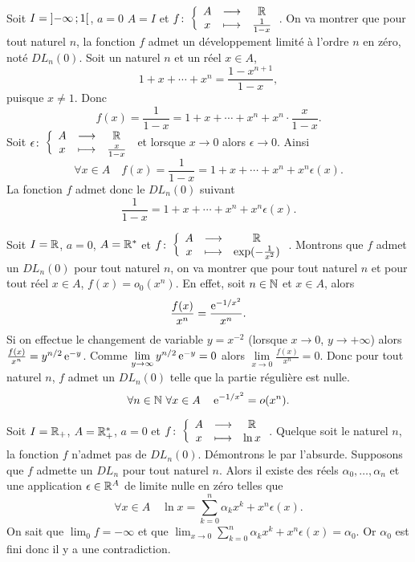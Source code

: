 Soit \(I=\left] -\infty \, ; {} 1 \right[\), \(a=0\) \(A=I\) et
\(f\colon\left\{\begin{array}{ccc}A & \longrightarrow &\mathbb{R}\\x & \longmapsto & \frac{1}{1-x}\end{array}\right.\). On va montrer que pour tout naturel
\(n\), la fonction \(f\) admet un développement limité à l'ordre \(n\) en zéro,
noté \(DL_n(0)\). Soit un naturel \(n\) et un réel \(x \in A\),
\begin{equation}
  1+x+ \dotsb + x^n = \frac{1-x^{n+1}}{1-x},
\end{equation}
puisque \(x \neq 1\). Donc
\begin{equation}
  f(x) = \frac{1}{1-x}=1+x+ \dotsb + x^n + x^n \cdot \frac{x}{1-x}.
\end{equation}
Soit \(\epsilon\colon\left\{\begin{array}{ccc}A & \longrightarrow &\mathbb{R}\\x & \longmapsto & \frac{x}{1-x}\end{array}\right.\) et lorsque \(x \to 0\)
alors \(\epsilon \to 0\). Ainsi
\begin{equation}
  \forall x \in A \quad f(x) = \frac{1}{1-x}=1+x+ \dotsb + x^n + x^n
  \epsilon(x).
\end{equation}
La fonction \(f\) admet donc le \(DL_n(0)\) suivant
\begin{equation}
  \frac{1}{1-x} = 1+x+ \dotsb + x^n + x^n \epsilon(x).
\end{equation}

Soit \(I=\mathbb{R}\), \(a=0\), \(A=\mathbb{R}^*\) et
\(f\colon\left\{\begin{array}{ccc}A & \longrightarrow &\mathbb{R}\\x & \longmapsto & \exp(-\frac{1}{x^2})\end{array}\right.\). Montrons que \(f\) admet un
\(DL_n(0)\) pour tout naturel \(n\), on va montrer que pour tout naturel \(n\)
et pour tout réel \(x \in A\), \(f(x)=o_0(x^n)\). En effet, soit \(n \in \mathbb{N}\) et
\(x \in A\), alors
\begin{equation}
  \frac{f(x)}{x^n}=\frac{\operatorname{e}^{-1/x^2}}{x^n}.
\end{equation}
Si on effectue le changement de variable \(y=x^{-2}\) (lorsque \(x \to 0\), \(y
\to + \infty\)) alors \(\frac{f(x)}{x^n}=y^{n/2}\operatorname{e}^{-y}\). Comme
\(\lim\limits_{y \to \infty} y^{n/2}\operatorname{e}^{-y} =0\) alors \(\lim\limits_{x \to 0}
\frac{f(x)}{x^n} =0\). Donc pour tout naturel \(n\), \(f\) admet un \(DL_n(0)\)
telle que la partie régulière est nulle.
\begin{equation}
  \forall n \in \mathbb{N} \ \forall x \in A \quad \operatorname{e}^{-1/x^2}=o(x^n).
\end{equation}

Soit \(I=\mathbb{R}_{+}\), \(A=\mathbb{R}_{+}^{*}\), \(a=0\) et \(f\colon\left\{\begin{array}{ccc}A & \longrightarrow &\mathbb{R}\\x & \longmapsto & \ln
x\end{array}\right.\). Quelque soit le naturel \(n\), la fonction \(f\) n'admet pas de
\(DL_n(0)\). Démontrons le par l'absurde. Supposons que \(f\) admette un
\(DL_n\) pour tout naturel \(n\). Alors il existe des réels \(\alpha_0, \ldots,
\alpha_n\) et une application \(\epsilon \in \mathbb{R}^A\) de limite nulle en zéro
telles que
\begin{equation}
  \forall x \in A \quad \ln x =\sum_{k=0}^n \alpha_k x^k + x^n\epsilon(x).
\end{equation}
On sait que \(\lim_0 f = -\infty\) et que \(\lim_{x \to 0} \sum_{k=0}^n \alpha_k
x^k + x^n\epsilon(x) = \alpha_0\). Or \(\alpha_0\) est fini donc il y a une
contradiction.

